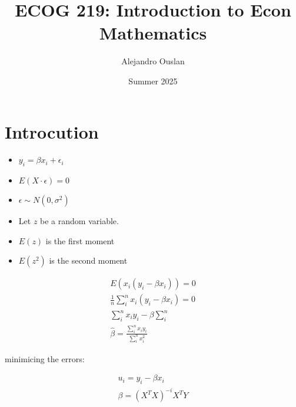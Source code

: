 \documentclass[10pt, oneside]{article}
\title{ECOG 219: Introduction to Econ Mathematics}
\author{Alejandro Ouslan}
\date{Summer 2025}
\begin{document}
\maketitle
\tableofcontents

\vspace{.25in}

\section{Introcution}
\begin{itemize}
  \item $y_i = \beta x_i + \epsilon_i$
  \item $E(X \cdot \epsilon) = 0$ 
  \item $\epsilon \sim N(0,\sigma^2)$
\end{itemize}


\begin{itemize}
  \item Let $z$ be a random variable. 
  \item $E(z)$ is the first moment 
  \item $E(z^2)$ is the second moment
\end{itemize}

\[
  \begin{split}
    E(x_i(y_i - \beta x_i)) = 0 \\
    \frac{1}{n}\sum_{i}^{n}x_i(y_i -\beta x_i) = 0 \\
    \sum_{i}^{n} x_i y_i - \beta \sum_{i}^{n} \\ 
    \hat{\beta} = \frac{\sum_{i}^{n}x_i y_i}{\sum_{i}^{n}x_i^2}
  \end{split}
\]


minimicing the errors:

\[
\begin{split}
  u_i = y_i - \beta x_i \\
  \beta = (X^TX)^{-i} X^{T}Y
\end{split}
\]
\end{document}
